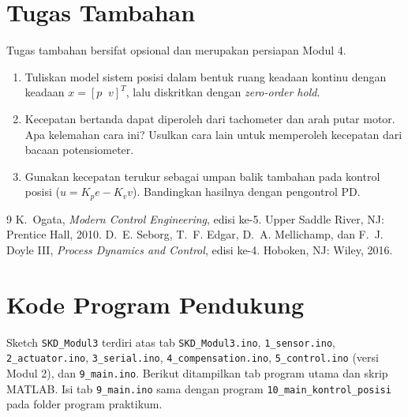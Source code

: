 \documentclass[11pt,a4paper]{article}
\newcommand{\prog}[1]{\texttt{#1}}
\begin{document}
\section{Tugas Tambahan}
Tugas tambahan bersifat opsional dan merupakan persiapan Modul 4.
\begin{enumerate}
\item Tuliskan model sistem posisi dalam bentuk ruang keadaan kontinu dengan keadaan $x = [p \;\; v]^T$, lalu diskritkan dengan \textit{zero-order hold}.
\item Kecepatan bertanda dapat diperoleh dari tachometer dan arah putar motor. Apa kelemahan cara ini? Usulkan cara lain untuk memperoleh kecepatan dari bacaan potensiometer.
\item Gunakan kecepatan terukur sebagai umpan balik tambahan pada kontrol posisi ($u = K_p e - K_v v$). Bandingkan hasilnya dengan pengontrol PD.
\end{enumerate}

\begin{thebibliography}{9}
 K.~Ogata, \textit{Modern Control Engineering}, edisi ke-5. Upper Saddle River, NJ: Prentice Hall, 2010.
 D.~E. Seborg, T.~F. Edgar, D.~A. Mellichamp, dan F.~J. Doyle III, \textit{Process Dynamics and Control}, edisi ke-4. Hoboken, NJ: Wiley, 2016.
\end{thebibliography}

\clearpage
\appendix
\section{Kode Program Pendukung}
\label{lamp:kode}
Sketch \prog{SKD\_Modul3} terdiri atas tab \prog{SKD\_Modul3.ino}, \prog{1\_sensor.ino}, \prog{2\_actuator.ino}, \prog{3\_serial.ino}, \prog{4\_compensation.ino}, \prog{5\_control.ino} (versi Modul 2), dan \prog{9\_main.ino}. Berikut ditampilkan tab program utama dan skrip MATLAB. Isi tab \prog{9\_main.ino} sama dengan program \prog{10\_main\_kontrol\_posisi} pada folder program praktikum.
\end{document}
